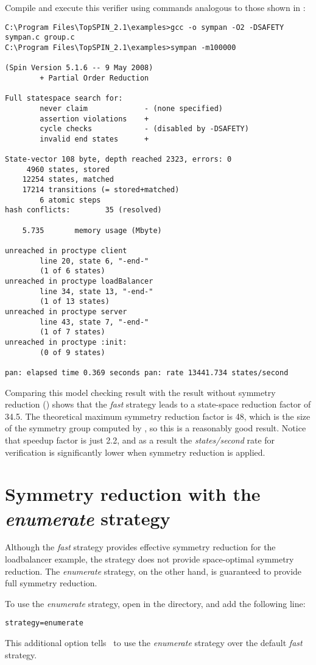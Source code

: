 Compile and execute this verifier using commands analogous to those
shown in :
%
\begin{lstlisting}
C:\Program Files\TopSPIN_2.1\examples>gcc -o sympan -O2 -DSAFETY sympan.c group.c
C:\Program Files\TopSPIN_2.1\examples>sympan -m100000

(Spin Version 5.1.6 -- 9 May 2008)
        + Partial Order Reduction

Full statespace search for:
        never claim             - (none specified)
        assertion violations    +
        cycle checks            - (disabled by -DSAFETY)
        invalid end states      +

State-vector 108 byte, depth reached 2323, errors: 0
     4960 states, stored
    12254 states, matched
    17214 transitions (= stored+matched)
        6 atomic steps
hash conflicts:        35 (resolved)

    5.735       memory usage (Mbyte)

unreached in proctype client
        line 20, state 6, "-end-"
        (1 of 6 states)
unreached in proctype loadBalancer
        line 34, state 13, "-end-"
        (1 of 13 states)
unreached in proctype server
        line 43, state 7, "-end-"
        (1 of 7 states)
unreached in proctype :init:
        (0 of 9 states)

pan: elapsed time 0.369 seconds pan: rate 13441.734 states/second
\end{lstlisting}
%
Comparing this model checking result with the result without
symmetry reduction () shows that the
\emph{fast} strategy leads to a state-space reduction factor of
34.5.  The theoretical maximum symmetry reduction factor is 48,
which is the size of the symmetry group computed by \topspin, so
this is a reasonably good result.  Notice that speedup factor is
just 2.2, and as a result the \emph{states/second} rate for
verification is significantly lower when symmetry reduction is
applied.
%
\section{Symmetry reduction with the \emph{enumerate} strategy}\label{sec:example:enumerate}
%
Although the \emph{fast} strategy provides effective symmetry
reduction for the loadbalancer example, the strategy does not
provide space-optimal symmetry reduction. The \emph{enumerate}
strategy, on the other hand, is guaranteed to provide full symmetry
reduction.

To use the \emph{enumerate} strategy, open  in
the  directory, and add the following line:
%
\begin{lstlisting}
strategy=enumerate
\end{lstlisting}
%
This additional option tells \topspin\ to use the \emph{enumerate}
strategy over the default \emph{fast} strategy.

